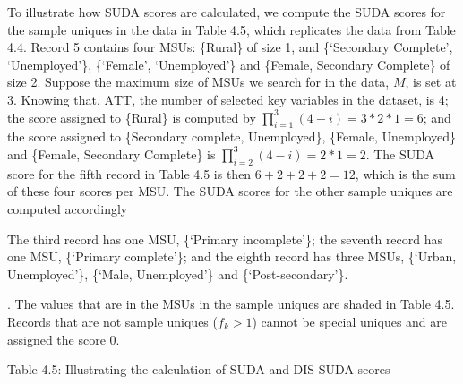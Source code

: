 \documentclass[letterpaper,10pt,english]{sphinxmanual}
\begin{document}
To illustrate how SUDA scores are calculated, we compute the SUDA scores
for the sample uniques in the data in Table 4.5, which replicates the
data from Table 4.4. Record 5 contains four MSUs: \{Rural\} of size 1, and
\{‘Secondary Complete’, ‘Unemployed’\}, \{‘Female’, ‘Unemployed’\} and
\{Female, Secondary Complete\} of size 2. Suppose the maximum size of MSUs
we search for in the data, \(M\), is set at 3. Knowing that,
\(\text{ATT}\), the number of selected key variables in the dataset,
is 4; the score assigned to \{Rural\} is computed by
\(\prod_{i = 1}^{3}{(4 - i)} = 3*2*1 = 6\); and the score assigned
to \{Secondary complete, Unemployed\}, \{Female, Unemployed\} and \{Female,
Secondary Complete\} is
\(\prod_{i = 2}^{3}\left( 4 - i \right) = 2*1 = 2\). The SUDA score
for the fifth record in Table 4.5 is then \(6 + 2 + 2 + 2 = 12\),
which is the sum of these four scores per MSU. The SUDA scores for the
other sample uniques are computed accordingly %
\begin{footnote}[13]\sphinxAtStartFootnote
The third record has one MSU, \{‘Primary incomplete’\}; the seventh
record has one MSU, \{‘Primary complete’\}; and the eighth record has
three MSUs, \{‘Urban, Unemployed’\}, \{‘Male, Unemployed’\} and
\{‘Post-secondary’\}.
%
\end{footnote}. The
values that are in the MSUs in the sample uniques are shaded in Table
4.5. Records that are not sample uniques (\(f_{k} > 1\)) cannot be
special uniques and are assigned the score 0.

Table 4.5: Illustrating the calculation of SUDA and DIS-SUDA scores
\end{document}

